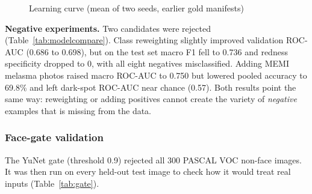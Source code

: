 \begin{figure}[ht]
\centering
{}
\caption{Learning curve (mean of two seeds, earlier gold manifests)}
\label{fig:lc}
\end{figure}

\textbf{Negative experiments.} Two candidates were rejected (Table~\ref{tab:modelcompare}). Class reweighting slightly improved validation ROC-AUC (0.686 to 0.698), but on the test set macro F1 fell to 0.736 and redness specificity dropped to 0, with all eight negatives misclassified. Adding MEMI melasma photos raised macro ROC-AUC to 0.750 but lowered pooled accuracy to 69.8\% and left dark-spot ROC-AUC near chance (0.57). Both results point the same way: reweighting or adding positives cannot create the variety of \emph{negative} examples that is missing from the data.

\subsubsection*{Face-gate validation}

The YuNet gate (threshold 0.9) rejected all 300 PASCAL VOC non-face images. It was then run on every held-out test image to check how it would treat real inputs (Table~\ref{tab:gate}).

